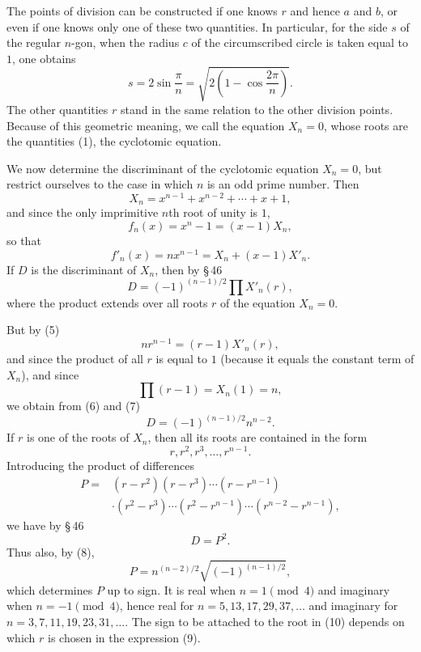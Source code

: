 \documentclass[11pt]{article}
\begin{document}
\begin{figure}[h]
\centering
{}
\par{}
\end{figure}

The points of division can be constructed if one knows $r$ and hence $a$ and $b$, or even if one knows only one of these two quantities. In particular, for the side $s$ of the regular $n$-gon, when the radius $c$ of the circumscribed circle is taken equal to $1$, one obtains
\[
        s=2\sin\frac{\pi}{n}=\sqrt{2\left(1-\cos\frac{2\pi}{n}\right)}.
\]
The other quantities $r$ stand in the same relation to the other division points. Because of this geometric meaning, we call the equation $X_n=0$, whose roots are the quantities (1), the cyclotomic equation.

We now determine the discriminant of the cyclotomic equation $X_n=0$, but restrict ourselves to the case in which $n$ is an odd prime number. Then
\[
\tag{3}        X_n=x^{n-1}+x^{n-2}+\cdots+x+1,
\]
and since the only imprimitive $n$th root of unity is $1$,
\[
\tag{4}        f_n(x)=x^n-1=(x-1)X_n,
\]
so that
\[
\tag{5}        f'_n(x)=nx^{n-1}=X_n+(x-1)X'_n.
\]
If $D$ is the discriminant of $X_n$, then by \S\,46
\[
\tag{6}        D=(-1)^{(n-1)/2}\prod X'_n(r),
\]
where the product extends over all roots $r$ of the equation $X_n=0$.

But by (5)
\[
\tag{7}        nr^{n-1}=(r-1)X'_n(r),
\]
and since the product of all $r$ is equal to $1$ (because it equals the constant term of $X_n$), and since
\[
        \prod(r-1)=X_n(1)=n,
\]
we obtain from (6) and (7)
\[
\tag{8}        D=(-1)^{(n-1)/2} n^{n-2}.
\]
If $r$ is one of the roots of $X_n$, then all its roots are contained in the form
\[
        r,r^2,r^3,\ldots,r^{n-1}.
\]
Introducing the product of differences
\[
\tag{9}\begin{aligned}
P={}&(r-r^2)(r-r^3)\cdots(r-r^{n-1})\\
&\cdot(r^2-r^3)\cdots(r^2-r^{n-1})\cdots(r^{n-2}-r^{n-1}),
\end{aligned}
\]
we have by \S\,46
\[
        D=P^2.
\]
Thus also, by (8),
\[
\tag{10}       P=n^{(n-2)/2}\sqrt{(-1)^{(n-1)/2}},
\]
which determines $P$ up to sign. It is real when $n=1\pmod4$ and imaginary when $n=-1\pmod4$, hence real for $n=5,13,17,29,37,\ldots$ and imaginary for $n=3,7,11,19,23,31,\ldots$. The sign to be attached to the root in (10) depends on which $r$ is chosen in the expression (9).
\end{document}
